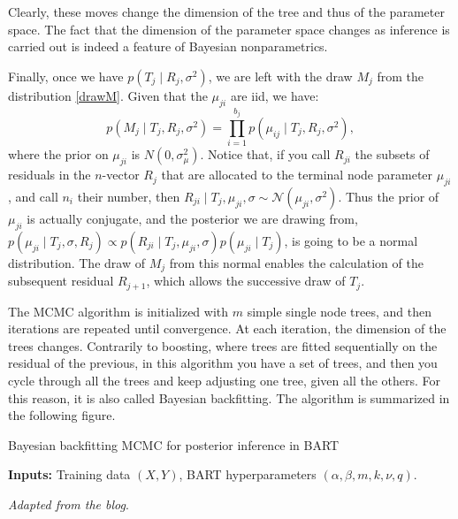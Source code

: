 \documentclass[a4paper,11pt]{article}
\begin{document}
    Clearly, these moves change the dimension of the tree and thus of the parameter space. The fact that the dimension of the parameter space changes as inference is carried out is indeed a feature of Bayesian nonparametrics. 

Finally, once we have $p(T_j \mid R_j, \sigma^2)$, we are left with the draw $M_j$ from the distribution \eqref{drawM}. Given that the $\mu_{ji}$ are iid, we have: 
$$ p(M_j \mid T_j, R_j, \sigma^2) = \prod_{i=1}^{b_j} p(\mu_{ij} \mid T_j, R_j, \sigma^2),
$$ where the prior on $\mu_{ji}$ is  $N(0, \sigma_\mu^2)$. Notice that, if you call  \( R_{ji} \) the subsets of residuals in the $n$-vector  $R_j$ that are allocated to the terminal node parameter  \( \mu_{ji} \), and call \( n_i \) their number, then \( R_{ji} \mid T_j, \mu_{ji}, \sigma \sim \mathcal{N}(\mu_{ji}, \sigma^2) \). Thus the prior of $\mu_{ji}$ is actually conjugate, and the posterior we are drawing from, $p(\mu_{ji} \mid T_j, \sigma, R_j) \propto p(R_{ji} \mid T_j, \mu_{ji}, \sigma) p(\mu_{ji} \mid T_j)$, is going to be a normal distribution. The draw of \( M_j \) from this normal enables the calculation of the subsequent residual \( R_{j+1} \), which allows the successive draw of \( T_j \). 

The MCMC algorithm is initialized with $m$ simple single node trees, and then iterations are
 repeated until convergence. At each iteration, the dimension of the trees changes. Contrarily to boosting, where trees are fitted sequentially on the residual of the previous, in this algorithm you have a set of trees, and then you cycle through all the trees and keep adjusting one tree, given all the others. For this reason, it is also called Bayesian backfitting. 
The algorithm is summarized in the following figure.
\begin{algorithm} [h]
  \caption{Bayesian backfitting MCMC for posterior inference in BART}
  \label{MCMC}
  \SetAlgoLined
  \DontPrintSemicolon
  
  \textbf{Inputs:} Training data $(X, Y)$, BART hyperparameters $(\alpha, \beta, m, k, \nu, q)$.\;
  
  
\end{algorithm}
\textit{Adapted from the blog}.
\end{document}
